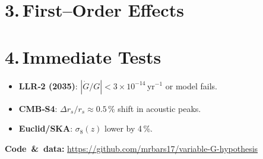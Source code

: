 ﻿\documentclass[11pt]{article}
\begin{document}
\section*{3.\,First--Order Effects}


\section*{4.\,Immediate Tests}
\begin{itemize}\itemsep2pt
\item \textbf{LLR‑2 (2035)}: $|\dot G/G|\!<\!3\!\times\!10^{-14}$\,yr$^{-1}$ or model fails.
\item \textbf{CMB‑S4}: $\Delta r_s/r_s\!\approx\!0.5\,\%$ shift in acoustic peaks.
\item \textbf{Euclid/SKA}: $\sigma_8(z)$ lower by 4\,\%.
\end{itemize}

\vspace{1em}
\noindent\small\textbf{Code \& data:}  
\url{https://github.com/mrbars17/variable-G-hypothesis}
\end{document}
